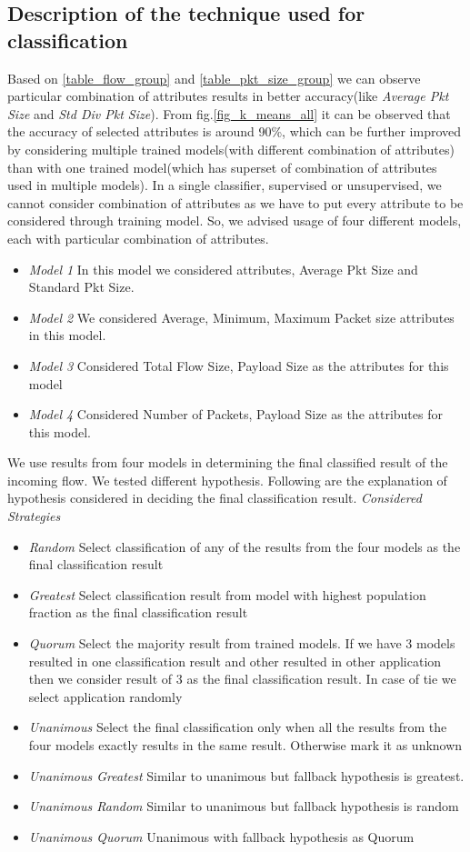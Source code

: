 \documentclass[conference]{IEEEtran}
\begin{document}
\subsection{Description of the technique used for classification}
Based on \ref{table_flow_group} and \ref{table_pkt_size_group} we can observe particular combination of attributes results in better accuracy(like \emph{Average Pkt Size} and \emph{Std Div Pkt Size}). From fig.\ref{fig_k_means_all} it can be observed that the accuracy of selected attributes is around 90\%, which can be further improved by considering multiple trained models(with different combination of attributes) than with one trained model(which has superset of combination of attributes used in multiple models). In a single classifier, supervised or unsupervised, we cannot consider combination of attributes as we have to put every attribute to be considered through training model. So, we advised usage of four different models, each with particular combination of attributes. 
\begin{itemize}
	\item \emph{Model 1}
	In this model we considered attributes, Average Pkt Size and Standard Pkt Size.
	\item \emph{Model 2}
	We considered Average, Minimum, Maximum Packet size attributes in this model.
	\item \emph{Model 3}
	Considered Total Flow Size, Payload Size as the attributes for this model
	\item \emph{Model 4}
	Considered Number of Packets, Payload Size as the attributes for this model.
\end{itemize}
We use results from four models in determining the final classified result of the incoming flow. We tested different hypothesis. Following are the explanation of hypothesis considered in deciding the final classification result.
\emph{Considered Strategies}
\begin{itemize} \itemsep3pt \parskip3pt 
	\item \emph{Random}
	Select classification of any of the results from the four models as the final classification result
	\item \emph{Greatest}
	Select classification result from model with highest population fraction as the final classification result
	\item \emph{Quorum}
	Select the majority result from trained models. If we have 3 models resulted in one classification result and other resulted in other application then we consider result of 3 as the final classification result. In case of tie we select application randomly
	\item \emph{Unanimous}
	Select the final classification only when all the results from the four models exactly results in the same result. Otherwise mark it as unknown
	\item \emph{Unanimous Greatest}
	Similar to unanimous but fallback hypothesis is greatest.
	\item \emph{Unanimous Random}
	Similar to unanimous but fallback hypothesis is random
	\item \emph{Unanimous Quorum}
	Unanimous with fallback hypothesis as Quorum
\end{itemize}
\end{document}
